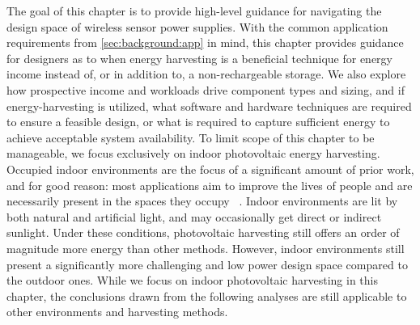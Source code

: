 The goal of this chapter is to provide high-level guidance for navigating the design space of wireless sensor power supplies.
With the common application requirements from \cref{sec:background:app} in mind, this chapter provides guidance for designers as to when energy harvesting is a beneficial technique for energy income instead of, or in addition to, a non-rechargeable storage. We also explore how prospective income and workloads drive component types and sizing, and if energy-harvesting is utilized, what software and hardware techniques are required to ensure a feasible design, or what is  
required to capture sufficient energy to achieve acceptable system availability.
To limit scope of this chapter to be manageable, we focus exclusively on indoor photovoltaic energy harvesting.
Occupied indoor environments are the focus of a significant
amount of
prior work,
and for good reason: most
applications aim to improve the lives of people and are necessarily present
in the spaces they occupy
~\cite{
  polastre2005telos,
  hnat2011hitchhiker,
  martin2012doubledip,
  adkins2015michigan,
  margolies2015energy,
  andersen2017hamilton,
  hesterFlicker17,
  truong2018capband,
  fraternali2018pible,
  grossiwindhager2019snaploc,
}.
Indoor environments are lit by both natural and artificial light,
and may occasionally get direct or indirect sunlight.
Under these conditions, photovoltaic harvesting still offers an order of magnitude more energy than other methods.
However, indoor environments still present a significantly more challenging and low power design space compared to the outdoor ones.
While we focus on
indoor photovoltaic harvesting in this chapter, the conclusions drawn from the following analyses are still applicable to other environments and harvesting methods.

